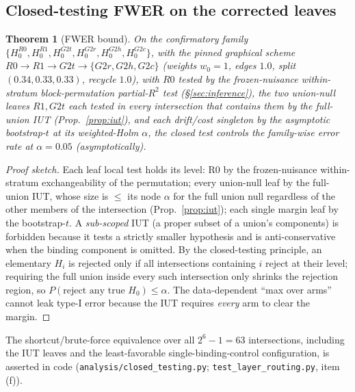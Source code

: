 \documentclass[11pt]{article}
\newtheorem{theorem}{Theorem}
\theoremstyle{definition}
\begin{document}
\subsection{Closed-testing FWER on the corrected leaves}
\begin{theorem}[FWER bound]
\label{thm:fwer}
On the confirmatory family $\{H_0^{R0},H_0^{R1},H_0^{G2t},H_0^{G2r},H_0^{G2h},H_0^{G2c}\}$,
with the pinned graphical scheme~\cite{bretz2009graphical} $R0\to R1\to G2t\to
\{G2r,G2h,G2c\}$ (weights $w_0{=}1$, edges $1.0$, split $(0.34,0.33,0.33)$, recycle $1.0$),
with $R0$ tested by the frozen-nuisance within-stratum block-permutation
partial-$R^2$ test (\S\ref{sec:inference}), the two union-null leaves $R1,G2t$ each tested
\emph{in every intersection that contains them} by the full-union IUT (Prop.~\ref{prop:iut}),
and each drift/cost singleton by the asymptotic bootstrap-$t$ at its weighted-Holm $\alpha$,
the closed test controls the family-wise error rate at $\alpha=0.05$ (asymptotically).
\end{theorem}
\begin{proof}[Proof sketch]
Each leaf local test holds its level: R0 by the frozen-nuisance within-stratum
exchangeability of the permutation; every union-null leaf by the full-union IUT, whose size
is $\le$ its node $\alpha$ for the full union null regardless of the other members of the
intersection (Prop.~\ref{prop:iut}); each single margin leaf by the bootstrap-$t$. A
\emph{sub-scoped} IUT (a proper subset of a union's components) is forbidden because it
tests a strictly smaller hypothesis and is anti-conservative when the binding component is
omitted. By the closed-testing principle, an elementary $H_i$ is rejected only if all
intersections containing $i$ reject at their level; requiring the full union inside every
such intersection only shrinks the rejection region, so $P(\text{reject any true }H_0)\le
\alpha$. The data-dependent ``max over arms'' cannot leak type-I error because the IUT
requires \emph{every} arm to clear the margin.
\end{proof}
\noindent The shortcut/brute-force equivalence over all $2^6-1=63$ intersections, including
the IUT leaves and the least-favorable single-binding-control configuration, is asserted in
code (\texttt{analysis/closed\_testing.py}; \texttt{test\_layer\_routing.py}, item (f)).
\end{document}
